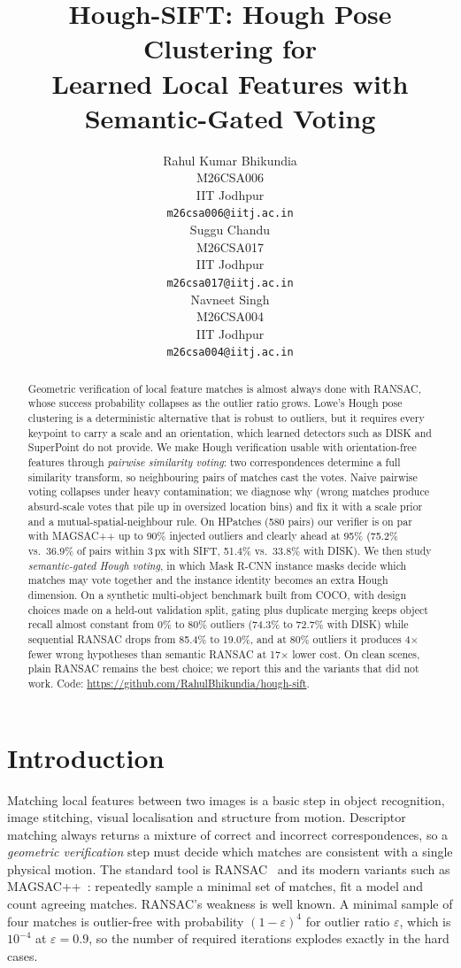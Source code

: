 \documentclass{article}
\title{Hough-SIFT: Hough Pose Clustering for\\Learned Local Features with Semantic-Gated Voting}
\author{%
  Rahul Kumar Bhikundia \\
  M26CSA006 \\
  IIT Jodhpur \\
  \texttt{m26csa006@iitj.ac.in} \\
  \And
  Suggu Chandu \\
  M26CSA017 \\
  IIT Jodhpur \\
  \texttt{m26csa017@iitj.ac.in} \\
  \And
  Navneet Singh \\
  M26CSA004 \\
  IIT Jodhpur \\
  \texttt{m26csa004@iitj.ac.in} \\
}
\begin{document}
\maketitle

\begin{abstract}
Geometric verification of local feature matches is almost always done with
RANSAC, whose success probability collapses as the outlier ratio grows. Lowe's
Hough pose clustering is a deterministic alternative that is robust to
outliers, but it requires every keypoint to carry a scale and an orientation,
which learned detectors such as DISK and SuperPoint do not provide. We make
Hough verification usable with orientation-free features through
\emph{pairwise similarity voting}: two correspondences determine a full
similarity transform, so neighbouring pairs of matches cast the votes. Naive
pairwise voting collapses under heavy contamination; we diagnose why (wrong
matches produce absurd-scale votes that pile up in oversized location bins)
and fix it with a scale prior and a mutual-spatial-neighbour rule. On HPatches
(580 pairs) our verifier is on par with MAGSAC++ up to 90\% injected outliers
and clearly ahead at 95\% (75.2\% vs.\ 36.9\% of pairs within 3\,px with
SIFT, 51.4\% vs.\ 33.8\% with DISK). We then study \emph{semantic-gated Hough
voting}, in which Mask R-CNN instance masks decide which matches may vote
together and the instance identity becomes an extra Hough dimension. On a
synthetic multi-object benchmark built from COCO, with design choices made on
a held-out validation split, gating plus duplicate merging keeps object
recall almost constant from 0\% to 80\% outliers (74.3\% to 72.7\% with DISK)
while sequential RANSAC drops from 85.4\% to 19.0\%, and at 80\% outliers it
produces 4$\times$ fewer wrong hypotheses than semantic RANSAC at 17$\times$
lower cost. On clean scenes, plain RANSAC remains the best choice; we report
this and the variants that did not work. Code:
\url{https://github.com/RahulBhikundia/hough-sift}.
\end{abstract}

\section{Introduction}

Matching local features between two images is a basic step in object
recognition, image stitching, visual localisation and structure from motion.
Descriptor matching always returns a mixture of correct and incorrect
correspondences, so a \emph{geometric verification} step must decide which
matches are consistent with a single physical motion. The standard tool is
RANSAC~\cite{fischler1981ransac} and its modern variants such as
MAGSAC++~\cite{barath2020magsacpp}: repeatedly sample a minimal set of matches,
fit a model and count agreeing matches. RANSAC's weakness is well known. A
minimal sample of four matches is outlier-free with probability
$(1-\varepsilon)^4$ for outlier ratio $\varepsilon$, which is $10^{-4}$ at
$\varepsilon=0.9$, so the number of required iterations explodes exactly in
the hard cases.
\end{document}

